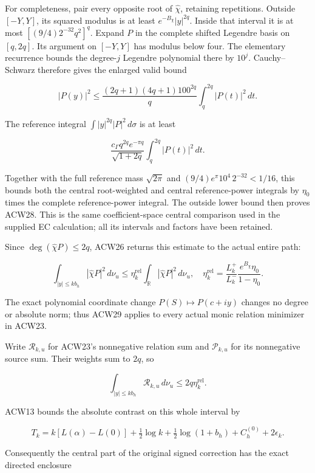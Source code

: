 For completeness, pair every opposite root of \(\widehat\chi\), retaining repetitions. Outside \([-Y,Y]\), its squared modulus is at least
\(e^{-B_\chi}|y|^{2q}\). Inside that interval it is at most
\([(9/4)2^{-32}q^2]^q\).
Expand \(P\) in the complete shifted Legendre basis on \([q,2q]\). Its argument on \([-Y,Y]\) has modulus below four. The elementary recurrence bounds the degree-\(j\) Legendre polynomial there by \(10^j\). Cauchy--Schwarz therefore gives the enlarged valid bound

\[
|P(y)|^2\le
\frac{(2q+1)(4q+1)100^{2q}}q
\int_q^{2q}|P(t)|^2\,dt.
\]

The reference integral
\(\int|y|^{2q}|P|^2\,d\sigma\) is at least

\[
\frac{c_\Gamma q^{2q}e^{-\pi q}}{\sqrt{1+2q}}
\int_q^{2q}|P(t)|^2\,dt.
\]

Together with the full reference mass \(\sqrt{2\pi}\) and
\((9/4)e^\pi10^4\,2^{-32}<1/16\), this bounds both the central root-weighted and central reference-power integrals by \(\eta_0\) times the complete reference-power integral. The outside lower bound then proves ACW28. This is the same coefficient-space central comparison used in the supplied EC calculation; all its intervals and factors have been retained.

Since \(\deg(\widehat\chi P)\le2q\), ACW26 returns this estimate to the actual entire path:

\[
\boxed{
\int_{|y|\le kb_h}|\widehat\chi P|^2\,d\nu_u
\le\eta_k^{\mathrm{rel}}\int_{\mathbb R}|\widehat\chi P|^2\,d\nu_u,
\quad
\eta_k^{\mathrm{rel}}=
\frac{L_k^+}{L_k^-}\frac{e^{B_\chi}\eta_0}{1-\eta_0}.}
\tag{ACW29}
\]

The exact polynomial coordinate change \(P(S)\mapsto P(c+iy)\) changes no degree or absolute norm; thus ACW29 applies to every actual monic relation minimizer in ACW23.

Write \(\mathcal R_{k,u}\) for ACW23's nonnegative relation sum and \(\mathcal P_{k,u}\) for its nonnegative source sum. Their weights sum to \(2q\), so

\[
\int_{|y|\le kb_h}\mathcal R_{k,u}\,d\nu_u
\le2q\eta_k^{\mathrm{rel}}.
\]

ACW13 bounds the absolute contrast on this whole interval by

\[
T_k=k[L(\alpha)-L(0)]
+\tfrac12\log k+\tfrac12\log(1+b_h)+C_h^{(0)}+2\epsilon_k.
\]

Consequently the central part of the original signed correction has the exact directed enclosure

